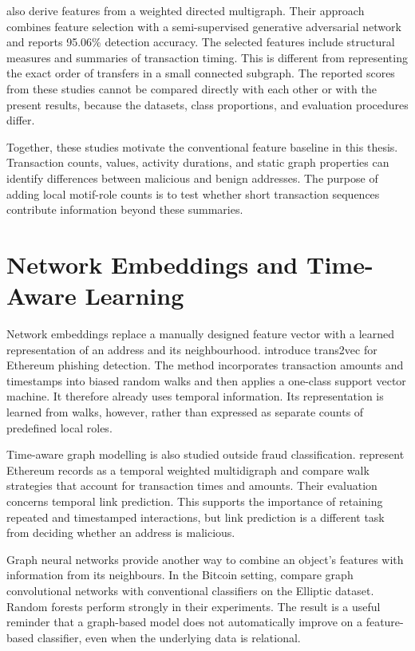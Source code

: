 \citet{sanjalawe2023atd} also derive features from a weighted directed
multigraph. Their approach combines feature selection with a semi-supervised
generative adversarial network and reports 95.06\% detection accuracy.
The selected features include structural measures and summaries of transaction
timing. This is different from representing the exact order of transfers in a
small connected subgraph. The reported scores from these studies cannot be
compared directly with each other or with the present results, because the
datasets, class proportions, and evaluation procedures differ.

Together, these studies motivate the conventional feature baseline in this
thesis. Transaction counts, values, activity durations, and static graph
properties can identify differences between malicious and benign addresses.
The purpose of adding local motif-role counts is to test whether short
transaction sequences contribute information beyond these summaries.

\section{Network Embeddings and Time-Aware Learning}
\label{sec:related_temporal_learning}

Network embeddings replace a manually designed feature vector with a learned
representation of an address and its neighbourhood.
\citet{wu2020phishers} introduce trans2vec for Ethereum phishing detection.
The method incorporates transaction amounts and timestamps into biased random
walks and then applies a one-class support vector machine. It therefore already
uses temporal information. Its representation is learned from walks, however,
rather than expressed as separate counts of predefined local roles.

Time-aware graph modelling is also studied outside fraud classification.
\citet{wu2020temporal} represent Ethereum records as a temporal weighted
multidigraph and compare walk strategies that account for transaction times and
amounts. Their evaluation concerns temporal link prediction. This supports the
importance of retaining repeated and timestamped interactions, but link
prediction is a different task from deciding whether an address is malicious.

Graph neural networks provide another way to combine an object's features with
information from its neighbours. In the Bitcoin setting,
\citet{weber2019bitcoin} compare graph convolutional networks with conventional
classifiers on the Elliptic dataset. Random forests perform strongly in their
experiments. The result is a useful reminder that a graph-based model does not
automatically improve on a feature-based classifier, even when the underlying
data is relational.

